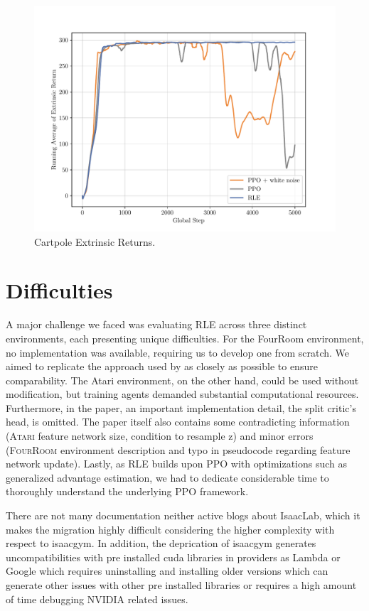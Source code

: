 \begin{figure}[H]
  \centering
  \includegraphics[width=\textwidth]{figures/plot_Cartpole_Extrinsic Return.pdf}
  \caption{Cartpole Extrinsic Returns.}
  \label{fig:cartpole-return}
\end{figure}

\hypertarget{appendix-difficult}{\section{Difficulties}}


\noindent A major challenge we faced was evaluating RLE across three distinct environments, each presenting unique difficulties. For the FourRoom environment, no implementation was available, requiring us to develop one from scratch. We aimed to replicate the approach used by \cite{rle-paper} as closely as possible to ensure comparability. The Atari environment, on the other hand, could be used without modification, but training agents demanded substantial computational resources. Furthermore, in the paper, an important implementation detail, the split critic's head, is omitted. The paper itself also contains some contradicting information (\textsc{Atari} feature network size, condition to resample z) and minor errors (\textsc{FourRoom} environment description and typo in pseudocode regarding feature network update). Lastly, as RLE builds upon PPO with optimizations such as generalized advantage estimation, we had to dedicate considerable time to thoroughly understand the underlying PPO framework.

\noindent There are not many documentation neither active blogs about IsaacLab, which it makes the migration highly difficult considering the higher complexity with respect
to isaacgym. In addition, the deprication of isaacgym generates uncompatibilities with pre installed cuda libraries in providers as Lambda or Google which requires uninstalling
and installing older versions which can generate other issues with other pre installed libraries or requires a high amount of time debugging NVIDIA related issues.